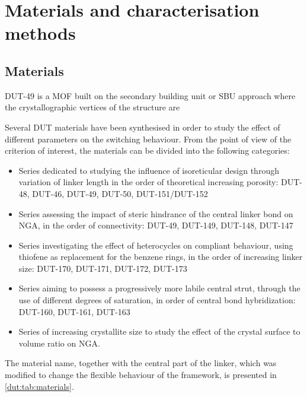
\section{Materials and characterisation methods}

\subsection{Materials}

DUT-49 is a MOF built on the secondary building unit or SBU approach
where the crystallographic vertices of the structure are  

Several DUT materials have been synthesised in order to 
study the effect of different parameters on the switching 
behaviour. From the point of view of the criterion of interest,
the materials can be divided into the following categories:

\begin{itemize}
    \item Series dedicated to studying the influence of isoreticular
    design through variation of linker length in the order of 
    theoretical increasing porosity: DUT-48, DUT-46, DUT-49, 
    DUT-50, DUT-151/DUT-152
    \item Series assessing the impact of steric hindrance of the 
    central linker bond on NGA, in the order of connectivity:
    DUT-49, DUT-149, DUT-148, DUT-147
    \item Series investigating the effect of heterocycles on compliant
    behaviour, using thiofene as replacement for the benzene rings, 
    in the order of increasing linker size: DUT-170, DUT-171, DUT-172,
    DUT-173
    \item Series aiming to possess a progressively more labile central 
    strut, through the use of different degrees of saturation,
    in order of central bond hybridization: DUT-160, DUT-161, DUT-163
    \item Series of increasing crystallite size to study the effect 
    of the crystal surface to volume ratio on NGA.
\end{itemize}

The material name, together with the central part of the linker, 
which was modified to change the flexible behaviour of the framework,
is presented in \autoref{dut:tab:materials}.

